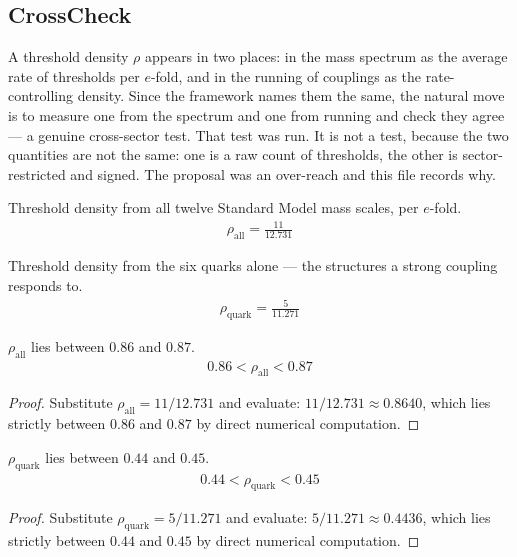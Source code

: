 \subsection{CrossCheck}

A threshold density $\rho$ appears in two places: in the mass spectrum as the average rate of thresholds per $e$-fold, and in the running of couplings as the rate-controlling density.  Since the framework names them the same, the natural move is to measure one from the spectrum and one from running and check they agree — a genuine cross-sector test.  That test was run.  It is not a test, because the two quantities are not the same: one is a raw count of thresholds, the other is sector-restricted and signed.  The proposal was an over-reach and this file records why.

\begin{definition}
Threshold density from all twelve Standard Model mass scales, per $e$-fold.
\begin{align*}
\rho_{\text{all}} = \frac{11}{12.731}
\end{align*}
\end{definition}

\begin{definition}
Threshold density from the six quarks alone — the structures a strong coupling responds to.
\begin{align*}
\rho_{\text{quark}} = \frac{5}{11.271}
\end{align*}
\end{definition}

\begin{proposition}
$\rho_{\text{all}}$ lies between $0.86$ and $0.87$.
\begin{align*}
0.86 < \rho_{\text{all}} < 0.87
\end{align*}
\begin{proof}
Substitute $\rho_{\text{all}}=11/12.731$ and evaluate: $11/12.731 \approx 0.8640$, which lies strictly between $0.86$ and $0.87$ by direct numerical computation.
\end{proof}
\end{proposition}

\begin{proposition}
$\rho_{\text{quark}}$ lies between $0.44$ and $0.45$.
\begin{align*}
0.44 < \rho_{\text{quark}} < 0.45
\end{align*}
\begin{proof}
Substitute $\rho_{\text{quark}}=5/11.271$ and evaluate: $5/11.271 \approx 0.4436$, which lies strictly between $0.44$ and $0.45$ by direct numerical computation.
\end{proof}
\end{proposition}

